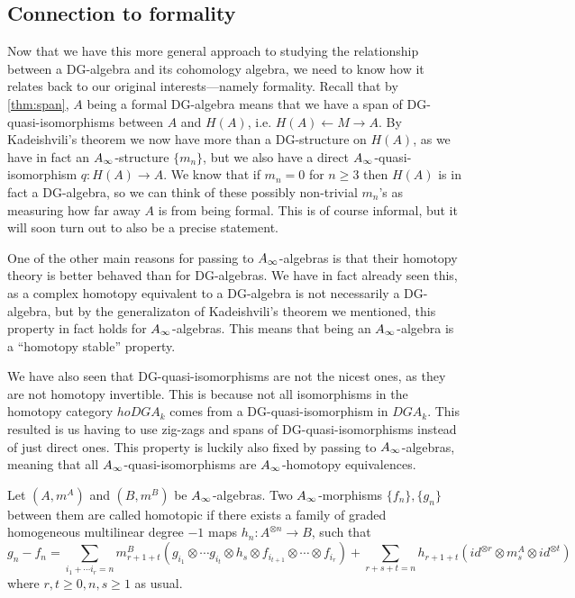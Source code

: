 \subsection{Connection to formality}

Now that we have this more general approach to studying the relationship between a DG-algebra and its cohomology algebra, we need to know how it relates back to our original interests---namely formality. Recall that by \cref{thm:span}, $A$ being a formal DG-algebra means that we have a span of DG-quasi-isomorphisms between $A$ and $H(A)$, i.e. $H(A)\longleftarrow M\longrightarrow A$. By Kadeishvili's theorem we now have more than a DG-structure on $H(A)$, as we have in fact an $\A$-structure $\{m_n\}$, but we also have a direct $\A$-quasi-isomorphism $q\colon H(A)\longrightarrow A$. We know that if $m_n = 0$ for $n\geq 3$ then $H(A)$ is in fact a DG-algebra, so we can think of these possibly non-trivial $m_n$'s as measuring how far away $A$ is from being formal. This is of course informal, but it will soon turn out to also be a precise statement. 

One of the other main reasons for passing to $\A$-algebras is that their homotopy theory is better behaved than for DG-algebras. We have in fact already seen this, as a complex homotopy equivalent to a DG-algebra is not necessarily a DG-algebra, but by the generalizaton of Kadeishvili's theorem we mentioned, this property in fact holds for $\A$-algebras. This means that being an $\A$-algebra is a ``homotopy stable'' property. 

We have also seen that DG-quasi-isomorphisms are not the nicest ones, as they are not homotopy invertible. This is because not all isomorphisms in the homotopy category $hoDGA_k$ comes from a DG-quasi-isomorphism in $DGA_k$. This resulted is us having to use zig-zags and spans of DG-quasi-isomorphisms instead of just direct ones. This property is luckily also fixed by passing to $\A$-algebras, meaning that all $\A$-quasi-isomorphisms are $\A$-homotopy equivalences. 


\begin{definition}[$\A$-homotopy]
\label{def:A_infinity-homotopy}
Let $(A, m^A)$ and $(B, m^B)$ be $\A$-algebras. Two $\A$-morphisms $\{f_n\}, \{g_n\}$ between them are called homotopic if there exists a family of graded homogeneous multilinear degree $-1$ maps $h_n:A^{\otimes n}\longrightarrow B$, such that 
\begin{equation*}
    g_n-f_n = \sum_{i_1+\cdots i_r = n}m^B_{r+1+t} (g_{i_1}\otimes \cdots g_{i_t}\otimes h_s \otimes f_{i_{t+1}}\otimes \cdots \otimes f_{i_r} ) + \sum_{r+s+t = n}h_{r+1+t} (id^{\otimes r}\otimes m^A_s \otimes id^{\otimes t})
\end{equation*}
where $r, t\geq 0, n, s\geq 1$ as usual. 
\end{definition}


